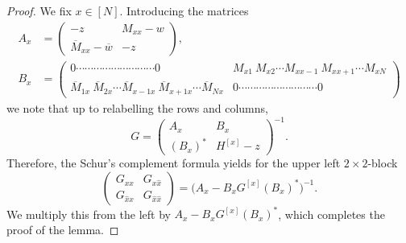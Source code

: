 \documentclass[11pt]{article}
\theoremstyle{plain}
\theoremstyle{remark}
\numberwithin{equation}{section}
\newcommand*\barr[1]{\overline{#1}}
\newcommand*\ubarr[1]{{\widehat{#1}}}
\begin{document}
	\begin{proof}
		We fix $x \in [N]$. Introducing the matrices 
		\begin{align*}
			A_{x} &= \left( \begin{array}{cc}-z                            & M_{xx} -w          \\
				\overline{M}_{xx}-\overline{w}& -z  \end{array}\right),  \\
			B_{ x} & = \left(\begin{array}{cc}0\cdots\cdots\cdots\cdots\cdots\cdots \cdots \cdots \cdots 0 & M_{x1}~ M_{x2}\cdots M_{x x-1}~ M_{x x+1} \cdots M_{x N} \\ \overline{M}_{1x} ~ \overline{M}_{2x} \cdots \barr{M}_{x-1 x} ~ \barr{M}_{x+1 x} \cdots \barr{M}_{Nx} & 0 \cdots\cdots\cdots\cdots\cdots\cdots \cdots \cdots \cdots 0  \end{array}\right)
		\end{align*}
		we note that  up to relabelling the rows and columns,  
		\begin{equation*} 
			G = \begin{pmatrix} A_{ x} & B_{ x}  \\ (B_{x})^* &  H^{[x]} -z  \end{pmatrix}^{-1}. 
		\end{equation*} 
		Therefore, the Schur's complement formula  
		yields for the upper left $2\times 2$-block 
		\[ \begin{pmatrix} G_{xx} & G_{x\ubarr{x}} \\ G_{\ubarr{x}x} & G_{\ubarr{x}\ubarr{x}} 
		\end{pmatrix} = \big(A_x - B_x G^{[x]} (B_x)^*\big)^{-1}. \] 
		We multiply this from the left by $A_x - B_x G^{[x]} (B_x)^*$, which completes the proof of the lemma.
	\end{proof}
	
\end{document}
